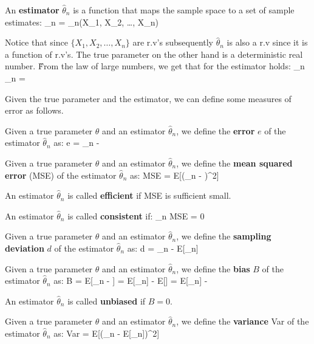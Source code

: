 \bd[Estimator]
An \textbf{estimator} $\hat{\theta}_{n}$ is a function that maps the sample space to a set of sample estimates:
\bse
\hat{\theta}_{n} = \hat{\theta}_{n}(X_{1}, X_{2}, \ldots, X_{n})
\ese
\ed

Notice that since $\{ X_{1}, X_{2}, \ldots, X_{n} \}$ are r.v's subsequently $\hat{\theta}_{n}$ is also a r.v since
it is a function of r.v's. The true parameter on the other hand is a deterministic real number. \v

From the law of large numbers, we get that for the estimator holds:
\bse
\lim_{n\to\infty} \hat{\theta}_{n} = \theta
\ese

Given the true parameter and the estimator, we can define some measures of error as follows.

\bd[Error]
Given a true parameter $\theta$ and an estimator $\hat{\theta}_{n}$, we define the \textbf{error} $e$ of the estimator
$\hat{\theta}_{n}$ as:
\bse
e = \hat{\theta}_{n} - \theta
\ese
\ed

Given a true parameter $\theta$ and an estimator $\hat{\theta}_{n}$, we define the \textbf{mean squared error} (MSE)
of the estimator $\hat{\theta}_{n}$ as:
\bse
MSE = E[(\hat{\theta}_{n} - \theta)^2]
\ese
\ed

An estimator $\hat{\theta}_{n}$ is called \textbf{efficient} if MSE is sufficient small.
\ed

An estimator $\hat{\theta}_{n}$ is called \textbf{consistent} if:
\bse
\lim_{n \to \infty} MSE = 0
\ese
\ed

Given a true parameter $\theta$ and an estimator $\hat{\theta}_{n}$, we define the \textbf{sampling deviation} $d$ of
the
estimator $\hat{\theta}_{n}$ as:
\bse
d = \hat{\theta}_{n} - E[\hat{\theta}_{n}]
\ese
\ed

\bd[Bias]
Given a true parameter $\theta$ and an estimator $\hat{\theta}_{n}$, we define the \textbf{bias} $B$ of the estimator
$\hat{\theta}_{n}$ as:
\bse
B = E[\hat{\theta}_{n} - \theta] = E[\hat{\theta}_{n}] - E[\theta] = E[\hat{\theta}_{n}] - \theta
\ese
\ed

An estimator $\hat{\theta}_{n}$ is called \textbf{unbiased} if $B=0$.
\ed

\bd[Variance]
Given a true parameter $\theta$ and an estimator $\hat{\theta}_{n}$, we define the \textbf{variance} Var of the
estimator
$\hat{\theta}_{n}$ as:
\bse
Var = E[(\hat{\theta}_{n} - E[\hat{\theta}_{n}])^2]
\ese
\ed

